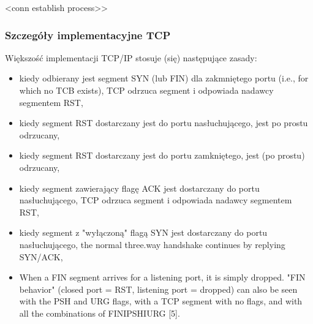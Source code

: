 <conn establish process>>


\subsubsection{Szczegóły implementacyjne TCP}

Większość implementacji TCP/IP stosuje (się) następujące zasady:
\begin{itemize}
\item kiedy odbierany jest segment SYN (lub FIN) dla zakmniętego portu (i.e., for which no TCB exists), TCP odrzuca segment i odpowiada nadawcy segmentem RST,
\item kiedy segment RST dostarczany jest do portu nasłuchującego, jest po prostu odrzucany,
\item kiedy segment RST dostarczany jest do portu zamkniętego, jest (po prostu) odrzucany,
\item kiedy segment zawierający flagę ACK jest dostarczany do portu nasłuchującego, TCP odrzuca segment i odpowiada nadawcy segmentem RST,
\item kiedy segment z "wyłączoną" flagą SYN jest dostarczany do portu nasłuchującego, the normal three.way handshake continues by replying SYN/ACK,
\item When a FIN segment arrives for a listening port, it is simply dropped. "FIN behavior" (closed port = RST, listening port = dropped) can also be seen with the PSH and URG flags, with a TCP segment with no flags, and with all the combinations of FINIPSHIURG [5].
\end{itemize}




